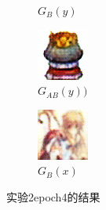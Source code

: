 \documentclass[twocolumn,11pt]{ctexart}
\begin{document}
\begin{figure}[htb]
\begin{subfigure}[b]{0.23\linewidth}
        \caption{$G_B(y)$}
      \end{subfigure}
      \begin{subfigure}[b]{0.23\linewidth}
        \includegraphics[width=\linewidth]{exp2_epoch004_rec_B.png}
        \caption{$G_{AB}(y))$}
      \end{subfigure}
      \begin{subfigure}[b]{0.23\linewidth}
        \includegraphics[width=\linewidth]{exp2_epoch004_idt_B.png}
        \caption{$G_B(x)$}
      \end{subfigure}
      \caption{实验2epoch4的结果}
      \label{fig:exp2epoch4}
\end{figure}
\end{document}
